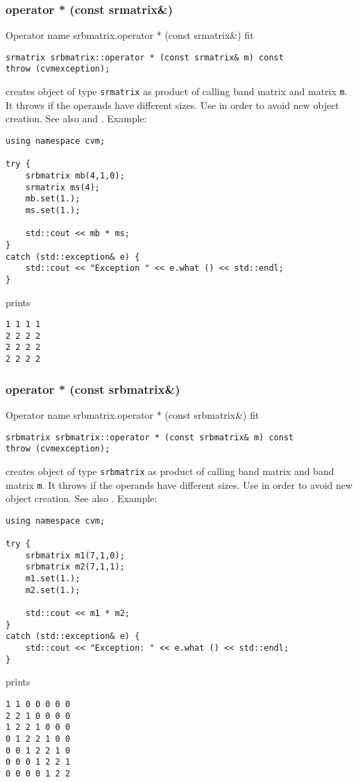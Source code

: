 \subsubsection{operator * (const srmatrix\&)}
Operator%
\pdfdest name {srbmatrix.operator * (const srmatrix&)} fit
\begin{verbatim}
srmatrix srbmatrix::operator * (const srmatrix& m) const
throw (cvmexception);
\end{verbatim}
creates  object of type \verb"srmatrix"
as  product of  calling band matrix and  matrix \verb"m".
It throws  
if the operands have different sizes.
Use  in order to avoid
 new object creation.
See also
 and .
Example:
\begin{Verbatim}
using namespace cvm;

try {
    srbmatrix mb(4,1,0);
    srmatrix ms(4);
    mb.set(1.);
    ms.set(1.);

    std::cout << mb * ms;
}
catch (std::exception& e) {
    std::cout << "Exception " << e.what () << std::endl;
}
\end{Verbatim}
prints
\begin{Verbatim}
1 1 1 1
2 2 2 2
2 2 2 2
2 2 2 2
\end{Verbatim}
\newpage



\subsubsection{operator * (const srbmatrix\&)}
Operator%
\pdfdest name {srbmatrix.operator * (const srbmatrix&)} fit
\begin{verbatim}
srbmatrix srbmatrix::operator * (const srbmatrix& m) const
throw (cvmexception);
\end{verbatim}
creates  object of type \verb"srbmatrix"
as  product of  calling band matrix and band matrix \verb"m".
It throws  
if the operands have different sizes.
Use  in order to avoid
 new object creation.
See also
.
Example:
\begin{Verbatim}
using namespace cvm;

try {
    srbmatrix m1(7,1,0);
    srbmatrix m2(7,1,1);
    m1.set(1.);
    m2.set(1.);

    std::cout << m1 * m2;
}
catch (std::exception& e) {
    std::cout << "Exception: " << e.what () << std::endl;
}
\end{Verbatim}
prints
\begin{Verbatim}
1 1 0 0 0 0 0
2 2 1 0 0 0 0
1 2 2 1 0 0 0
0 1 2 2 1 0 0
0 0 1 2 2 1 0
0 0 0 1 2 2 1
0 0 0 0 1 2 2
\end{Verbatim}
\newpage




